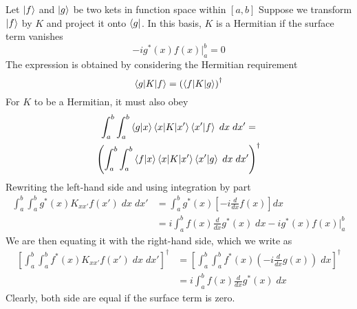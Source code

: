 \documentclass[../main.tex]{subfiles}
\begin{document}
Let $\ket{f}$ and $\ket{g}$ be two kets in function space within $[a,b]$
Suppose we transform $\ket{f}$ by $K$ and project it onto $\bra{g}$.
In this basis, $K$ is a Hermitian if the surface term vanishes
\begin{equation*}
	-ig ^*(x)f(x)\bigg|_{a}^b=0
\end{equation*}
The expression is obtained by considering the Hermitian requirement
\begin{equation*}
	\braket{g|K|f}=\left(\braket{f|K|g}\right)^\dagger
\end{equation*}
For $K$ to be a Hermitian, it must also obey
\begin{multline*}
	\int_{a }^{b }\int_{ a }^{b }\braket{g|x}\braket{x|K|x'}\braket{x'|f}\;dx\;dx'
	=\\
	\left(	\int_{a }^{b }\int_{ a }^{b }\braket{f|x}\braket{x|K|x'}\braket{x'|g}\;dx\;dx'\right)^\dagger
\end{multline*}
Rewriting the left-hand side and using integration by part
\begin{align*}
	\int_{a}^{b}\int_{a }^{b}g ^*(x)K_{xx'}f(x')\;dx\;dx' & =\int_{a}^b g ^*(x)\left[-i \frac{d }{dx}f(x)\right]dx                 \\
	                                                      & =i\int_{a }^{b }f(x) \frac{d }{dx}g ^*(x)\;dx-ig ^*(x)f(x)\bigg|_{a}^b
\end{align*}
We are then equating it with the right-hand side, which we write as
\begin{align*}
	\left[\int_{a }^{b}\int_{a }^{b}f ^*(x)K_{xx'}f(x')\;dx\;dx'\right]^\dagger & =
	\left[\int_{a }^{b }\int_{a}^{b}f ^*(x)\left(-i \frac{d }{dx}g(x)\right)\;dx\right]^\dagger                                \\
	                                                                            & =i\int_{a }^{b }f(x)\frac{d }{dx}g ^*(x)\;dx
\end{align*}
Clearly, both side are equal if the surface term is zero.
\end{document}
